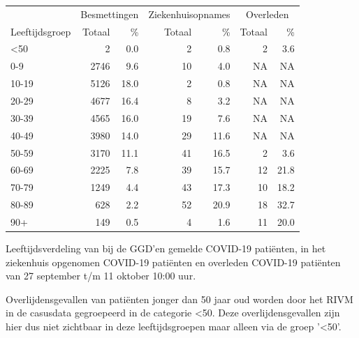 \documentclass[
  english,
  man,floatsintext]{apa6}
\begin{document}
\begin{table}
\centering\begingroup\fontsize{11}{13}\selectfont

\begin{threeparttable}
\begin{tabular}{lrrrrrr}
\toprule
\multicolumn{1}{c}{ } & \multicolumn{2}{c}{Besmettingen} & \multicolumn{2}{c}{Ziekenhuisopnames} & \multicolumn{2}{c}{Overleden} \\
\cmidrule(l{3pt}r{3pt}){2-3} \cmidrule(l{3pt}r{3pt}){4-5} \cmidrule(l{3pt}r{3pt}){6-7}
Leeftijdsgroep & Totaal & \% & Totaal & \% & Totaal & \%\\
\midrule
<50 & 2 & 0.0 & 2 & 0.8 & 2 & 3.6\\
0-9 & 2746 & 9.6 & 10 & 4.0 & NA & NA\\
10-19 & 5126 & 18.0 & 2 & 0.8 & NA & NA\\
20-29 & 4677 & 16.4 & 8 & 3.2 & NA & NA\\
30-39 & 4565 & 16.0 & 19 & 7.6 & NA & NA\\
40-49 & 3980 & 14.0 & 29 & 11.6 & NA & NA\\
50-59 & 3170 & 11.1 & 41 & 16.5 & 2 & 3.6\\
60-69 & 2225 & 7.8 & 39 & 15.7 & 12 & 21.8\\
70-79 & 1249 & 4.4 & 43 & 17.3 & 10 & 18.2\\
80-89 & 628 & 2.2 & 52 & 20.9 & 18 & 32.7\\
90+ & 149 & 0.5 & 4 & 1.6 & 11 & 20.0\\
\bottomrule
\end{tabular}
\begin{tablenotes}
\item[1] Leeftijdsverdeling van bij de GGD’en gemelde COVID-19 patiënten, in het ziekenhuis opgenomen COVID-19 patiënten en overleden COVID-19 patiënten van 27 september t/m 11 oktober 10:00 uur.
\item[2] Overlijdensgevallen van patiënten jonger dan 50 jaar oud worden door het RIVM in de casusdata gegroepeerd in de categorie <50. Deze overlijdensgevallen zijn hier dus niet zichtbaar in deze leeftijdsgroepen maar alleen via de groep '<50'.
\end{tablenotes}
\end{threeparttable}
\endgroup{}
\end{table}

\newpage
\end{document}
